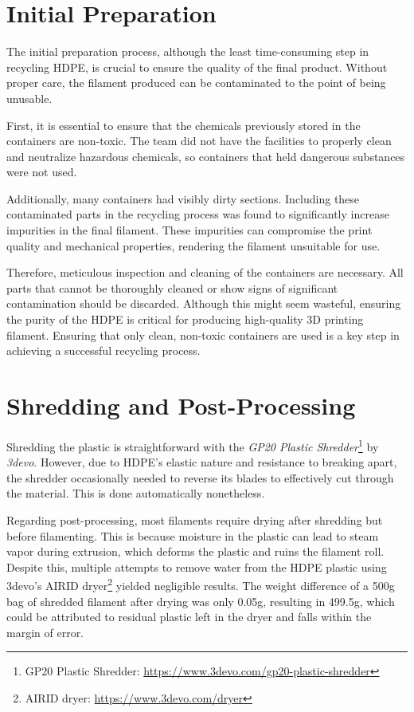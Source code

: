 \section{Initial Preparation}

The initial preparation process, although the least time-consuming step in recycling HDPE, is 
crucial to ensure the quality of the final product. Without proper care, the filament produced can 
be contaminated to the point of being unusable.

First, it is essential to ensure that the chemicals previously stored in the containers are 
non-toxic. The team did not have the facilities to properly clean and neutralize hazardous 
chemicals, so containers that held dangerous substances were not used.

Additionally, many containers had visibly dirty sections. Including these contaminated parts in 
the recycling process was found to significantly increase impurities in the final filament. These 
impurities can compromise the print quality and mechanical properties, rendering the filament 
unsuitable for use.

Therefore, meticulous inspection and cleaning of the containers are necessary. All parts that 
cannot be thoroughly cleaned or show signs of significant contamination should be discarded. 
Although this might seem wasteful, ensuring the purity of the HDPE is critical for producing 
high-quality 3D printing filament. Ensuring that only clean, non-toxic containers are used is a 
key step in achieving a successful recycling process.

\section{Shredding and Post-Processing}

Shredding the plastic is straightforward with the \textit{GP20 Plastic Shredder}\footnote{GP20 
Plastic Shredder: \url{https://www.3devo.com/gp20-plastic-shredder}} by \textit{3devo}. However, 
due to HDPE's elastic nature and resistance to breaking apart, the shredder occasionally needed to 
reverse its blades to effectively cut through the material. This is done automatically nonetheless.

Regarding post-processing, most filaments require drying after shredding but before filamenting. 
This is because moisture in the plastic can lead to steam vapor during extrusion, which deforms 
the plastic and ruins the filament roll. Despite this, multiple attempts to remove water from the 
HDPE plastic using 3devo's AIRID dryer\footnote{AIRID dryer: \url{https://www.3devo.com/dryer}} 
yielded negligible results. The weight difference of a 500g bag of shredded filament after drying 
was only 0.05g, resulting in 499.5g, which could be attributed to residual plastic left in the 
dryer and falls within the margin of error.

